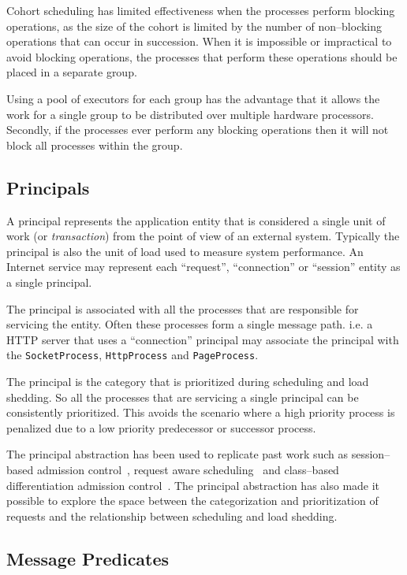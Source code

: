 \documentclass[conference]{IEEEtran}
\begin{document}
Cohort scheduling has limited effectiveness when the processes perform blocking operations, as the size of the cohort is limited by the number of non--blocking operations that can occur in succession. When it is impossible or impractical to avoid blocking operations, the processes that perform these operations should be placed in a separate group.

Using a pool of executors for each group has the advantage that it allows the work for a single group to be distributed over multiple hardware processors. Secondly, if the processes ever perform any blocking operations then it will not block all processes within the group. 

\subsection{Principals}

A principal represents the application entity that is considered a single unit of work (or \emph{transaction}) from the point of view of an external system. Typically the principal is also the unit of load used to measure system performance. An Internet service may represent each ``request'', ``connection'' or ``session'' entity as a single principal.

The principal is associated with all the processes that are responsible for servicing the entity. Often these processes form a single message path. i.e. a HTTP server that uses a ``connection'' principal may associate the principal with the \verb+SocketProcess+, \verb+HttpProcess+ and \verb+PageProcess+.

The principal is the category that is prioritized during scheduling and load shedding. So all the processes that are servicing a single principal can be consistently prioritized. This avoids the scenario where a high priority process is penalized due to a low priority predecessor or successor process.

The principal abstraction has been used to replicate past work such as session--based admission control~\cite{Cherkasova:2002yb}, request aware scheduling~\cite{Zhou06RequestAware} and class--based differentiation admission control~\cite{welsh03Adaptive}. The principal abstraction has also made it possible to explore the space between the categorization and prioritization of requests and the relationship between scheduling and load shedding.

\subsection{Message Predicates}
\end{document}
